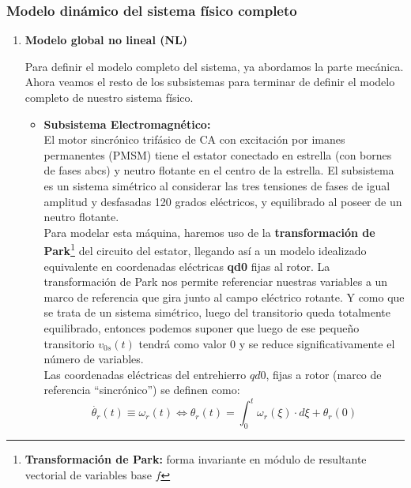 \documentclass[10pt]{article}
\begin{document}
\begin{itemize}
\end{itemize}

\subsubsection{Modelo dinámico del sistema físico completo}

\begin{enumerate}
    \renewcommand{\theenumi}{\alph{enumi}} %
    \item \textbf{Modelo global no lineal (NL)}
    
    Para definir el modelo completo del sistema, ya abordamos la parte mecánica. Ahora veamos el resto de los subsistemas para terminar de definir el modelo completo de nuestro sistema físico.
	\begin{itemize}
		\item \textbf{Subsistema Electromagnético:}\vspace{0.3cm}\\
		El motor sincrónico trifásico de CA con excitación por imanes permanentes (PMSM) tiene el estator conectado en estrella (con bornes de fases abcs) y neutro flotante en el centro de la estrella.
		El subsistema es un sistema simétrico al considerar las tres tensiones de fases de igual amplitud y desfasadas 120 grados eléctricos, y equilibrado al poseer de un neutro flotante.
		\vspace{0.3cm}\\
		Para modelar esta máquina, haremos uso de la \textbf{transformación de Park}\footnote[1]{\textbf{Transformación de Park:} forma invariante en módulo de resultante vectorial de variables base $f$} del circuito del estator, llegando así a un modelo idealizado equivalente en coordenadas eléctricas \textbf{qd0} fijas al rotor.
		La transformación de Park nos permite referenciar nuestras variables a un marco de referencia que gira junto al campo eléctrico rotante.
		Y como que se trata de un sistema simétrico, luego del transitorio queda totalmente equilibrado, entonces podemos suponer que luego de ese pequeño transitorio $v_{0s}(t)$ tendrá como valor $0$ y se reduce significativamente el número de variables.
		\vspace{0.3cm}\\
		Las coordenadas eléctricas del entrehierro $qd0$, fijas a rotor (marco de referencia “sincrónico”) se definen como:
		\begin{equation}
			\dot{\theta_{r}}\left ( t \right )\equiv \omega_{r}\left ( t \right )\Leftrightarrow \theta_{r}\left ( t \right )=\int_{0}^{t}\omega_{r}\left ( \xi \right )\cdot d\xi + \theta_{r}\left ( 0 \right )

\end{equation}
\end{itemize}
\end{enumerate}
\end{document}
